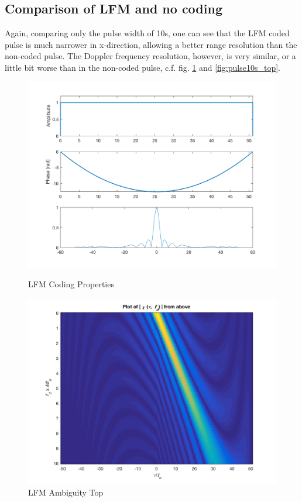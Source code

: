 \subsection{Comparison of LFM and no coding}

Again, comparing only the pulse width of 10s, one can see that the LFM coded pulse is much narrower in x-direction, allowing a better range resolution than the non-coded pulse. The Doppler frequency resolution, however, is very similar, or a little bit worse than in the non-coded pulse, c.f. fig. \ref{fig:lfm_top} and \ref{fig:pulse10s_top}.

\begin{figure}[!htbp]
  \centering
  \begin{minipage}[b]{0.45\textwidth}
    \includegraphics[width=\textwidth]{images/lfm_props}
    \caption{LFM Coding Properties}
    \label{fig:lfm_props}
  \end{minipage}
  \hfill
  \begin{minipage}[b]{0.45\textwidth}
    \includegraphics[width=\textwidth]{images/lfm_top}
    \caption{LFM Ambiguity Top}
    \label{fig:lfm_top}
  \end{minipage}
\end{figure}


